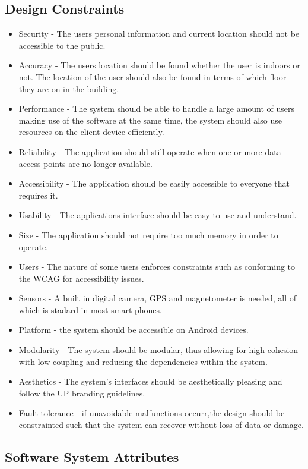 \documentclass{article}
\begin{document}
	\subsection{Design Constraints}
		\begin{itemize}
				\item Security  - The users personal information and current location should not be accessible to the public.
				\item Accuracy - The users location should be found whether the user is indoors or not. The location of the user should also be found in terms of which floor they are on in the building.
				\item Performance - The system should be able to handle a large amount of users making use of the software at the same time, the system should also use resources on the client device efficiently.
				\item Reliability - The application should still operate when one or more data access points are no longer available.
				\item Accessibility - The application should be easily accessible to everyone that requires it.
				\item Usability - The applications interface should be easy to use and understand.
				\item Size - The application should not require too much memory in order to operate.
				\item Users - The nature of some users enforces constraints such as conforming to the WCAG for accessibility issues.
				\item Sensors - A built in digital camera, GPS and magnetometer is needed, all of which is stadard in most smart phones.
				\item Platform - the system should be accessible on  Android  devices.
				\item Modularity - The system should be modular, thus allowing for high cohesion with low coupling and reducing the dependencies within the system.
				\item Aesthetics - The system's interfaces should be aesthetically pleasing and follow the UP branding guidelines.
				\item Fault tolerance - if unavoidable malfunctions occurr,the design should be constrainted such that the system can recover without loss of data or damage.
				
			\end{itemize}
	
	\subsection{Software System Attributes}
\end{document}
